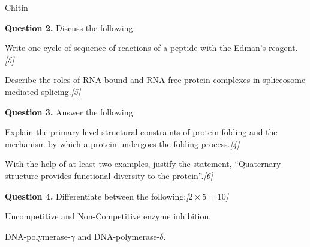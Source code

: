 \documentclass[11pt,a4paper]{article}
\newcommand{\pts}[1]{\hfill   \textit{[#1]}}
\begin{document}
\begin{parts}
\begin{parts}
\begin{center}
    \end{center}

    \item Chitin
  \end{parts}
\end{parts}

\medskip


\noindent   \textbf{Question 2.} Discuss the following:

\begin{parts}
  \item Write one cycle of sequence of reactions of a peptide with the Edman's reagent.\pts{5}
  \item Describe the roles of RNA-bound and RNA-free protein complexes in spliceosome mediated splicing.\pts{5}
\end{parts}

\medskip


\noindent   \textbf{Question 3.} Answer the following:

\begin{parts}
  \item Explain the primary level structural constraints of protein folding and the mechanism by which a protein undergoes the folding process.\pts{4}
  \item With the help of at least two examples, justify the statement, ``Quaternary structure provides functional diversity to the protein''.\pts{6}
\end{parts}

\medskip


\noindent   \textbf{Question 4.} Differentiate between the following:\pts{$2  \times 5 = 10$}

\begin{parts}
  \item Uncompetitive and Non-Competitive enzyme inhibition.
  \item DNA-polymerase-$\gamma$ and DNA-polymerase-$\delta$.
\end{parts}
\end{document}
